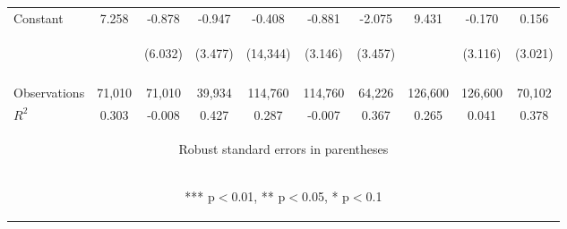 \documentclass[]{article}
\begin{document}
\begin{center}
\begin{tabular}{lccccccccc}
Constant & 7.258 & -0.878 & -0.947 & -0.408 & -0.881 & -2.075 & 9.431 & -0.170 & 0.156 \\
 & \begin{footnotesize}\end{footnotesize} & \begin{footnotesize}(6.032)\end{footnotesize} & \begin{footnotesize}(3.477)\end{footnotesize} & \begin{footnotesize}(14,344)\end{footnotesize} & \begin{footnotesize}(3.146)\end{footnotesize} & \begin{footnotesize}(3.457)\end{footnotesize} & \begin{footnotesize}\end{footnotesize} & \begin{footnotesize}(3.116)\end{footnotesize} & \begin{footnotesize}(3.021)\end{footnotesize} \\
\vspace{4pt} & \begin{footnotesize}\end{footnotesize} & \begin{footnotesize}\end{footnotesize} & \begin{footnotesize}\end{footnotesize} & \begin{footnotesize}\end{footnotesize} & \begin{footnotesize}\end{footnotesize} & \begin{footnotesize}\end{footnotesize} & \begin{footnotesize}\end{footnotesize} & \begin{footnotesize}\end{footnotesize} & \begin{footnotesize}\end{footnotesize} \\
Observations & 71,010 & 71,010 & 39,934 & 114,760 & 114,760 & 64,226 & 126,600 & 126,600 & 70,102 \\
 $R^2$ & 0.303 & -0.008 & 0.427 & 0.287 & -0.007 & 0.367 & 0.265 & 0.041 & 0.378 \\ \hline
\multicolumn{10}{c}{\begin{footnotesize} Robust standard errors in parentheses\end{footnotesize}} \\
\multicolumn{10}{c}{\begin{footnotesize} *** p$<$0.01, ** p$<$0.05, * p$<$0.1\end{footnotesize}} \\
\end{tabular}
\end{center}
\end{document}
